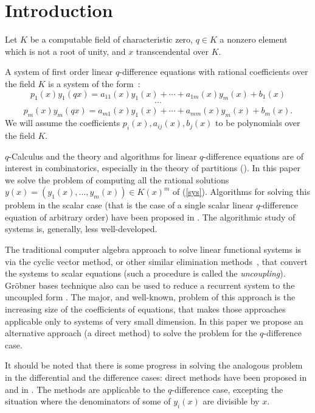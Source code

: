 \section{Introduction}\label{introd}
Let $K$ be a computable field of characteristic zero,
$q\in K$ a nonzero element which is not a root of unity,
and $x$ transcendental over $K$.

A system of first order linear $q$-difference equations
with rational coefficients over the field $K$ is a system of the form~:
\newpage
$$
p_1(x)y_1(qx)=a_{11}(x)y_1(x)+\cdots
+a_{1m}(x)y_m(x)+b_1(x)
$$
\begin{eqnarray}\label{sys}
\cdots\end{eqnarray}
$$
p_m(x)y_m(qx)=a_{m1}(x)y_1(x)+\cdots
+a_{mm}(x)y_m(x)+b_m(x).
$$
We will assume
the coefficients $p_i(x),a_{ij}(x),b_j(x)$ to be
polynomials
over
the field $K$.


$q$-Calculus and the theory and algorithms
for linear $q$-difference equations are of interest in
combinatorics, especially in the theory of partitions
(\cite{And,q-series}).
In this paper we solve the problem
of computing all the rational solutions
$y(x) =(y_1(x),\dots ,y_m(x)) \in K(x)^m$
of (\ref{sys}).
Algorithms for solving this problem in the scalar case (that is
the case of a single scalar linear
$q$-difference equation of arbitrary order)
have been proposed in \cite{ABP,Aprog}.
The algorithmic study of systems is, generally, less well-developed.


The traditional computer algebra approach to solve
linear functional systems
is via the cyclic vector method, or other similar elimination
methods~\cite{BP96,AZ}, that convert
the systems to scalar equations (such a procedure is called
the {\em uncoupling}).
Gr\"obner bases technique also can be used to reduce a recurrent
system to the uncoupled form \cite{ChyzGB}.
The major, and well-known, problem of this approach
is the increasing size of the coefficients of
equations, that makes those
approaches applicable only to systems of very small dimension.
In this paper we propose an alternative
approach (a direct method) to solve the problem for the
$q$-difference case.

It should be noted that there is some progress in solving
the analogous problem in the differential  and the
difference cases: direct methods have been
proposed
in \cite{Bar97} and in
\cite{AB98,vh98}.
The methods \cite{AB98,vh98} are applicable to the
$q$-difference case, excepting the situation where the
denominators of some of $y_i(x)$ are divisible by $x$.


